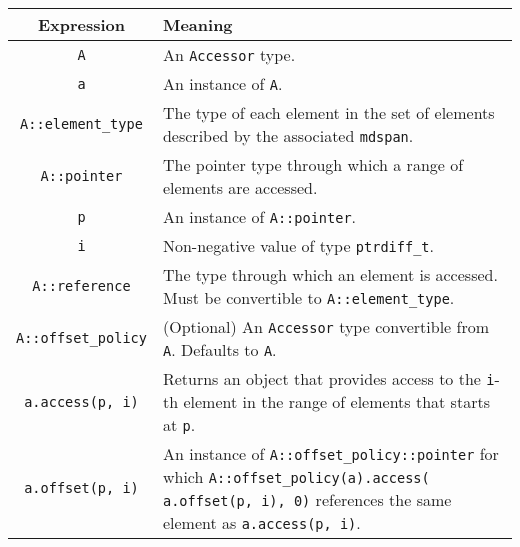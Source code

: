 \begin{tabular}{|c|p{15em}|}
\hline
Expression & Meaning \\
\hline
    \texttt{A} & An \texttt{Accessor} type. \\
    \texttt{a} & An instance of \texttt{A}. \\
    \texttt{A::element\_type} & The type of each element in the set of elements described by the associated \texttt{mdspan}. \\
    \texttt{A::pointer} & The pointer type through which a range of elements are accessed. \\
    \texttt{p} & An instance of \texttt{A::pointer}. \\
    \texttt{i} & Non-negative value of type \texttt{ptrdiff\_t}. \\
    \texttt{A::reference} & The type through which an element is accessed.  Must be convertible to \texttt{A::element\_type}. \\
    \texttt{A::offset\_policy} & (Optional) An \texttt{Accessor} type convertible from \texttt{A}. Defaults to \texttt{A}. \\
    \texttt{a.access(p, i)} & Returns an object that provides access to the \texttt{i}-th element in the range of elements that starts at \texttt{p}. \\
    \texttt{a.offset(p, i)} & An instance of \texttt{A::offset\_policy::pointer} for which \texttt{A::offset\_policy(a).access( a.offset(p, i), 0)} references the same element as \texttt{a.access(p, i)}. \\
\hline
\end{tabular}
